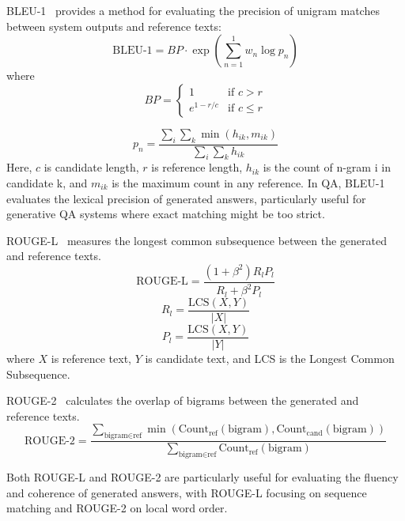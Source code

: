 \documentclass{article}
\begin{document}
BLEU-1~\cite{papineni2002bleu} provides a method for evaluating the precision of unigram matches between system outputs and reference texts:
\begin{equation}
    \text{BLEU-1} = BP \cdot \exp(\sum_{n=1}^{1} w_n \log p_n)
\end{equation}
where 
\begin{equation}
    BP = \begin{cases}
        1 & \text{if } c > r \\
        e^{1-r/c} & \text{if } c \leq r
        \end{cases}
\end{equation}

\begin{equation}
    p_n = \frac{\sum_{i}\sum_{k}\min(h_{ik}, m_{ik})}{\sum_{i}\sum_{k}h_{ik}}
\end{equation}
Here, \( c \) is candidate length, \( r \) is reference length, \( h_{ik} \) is the count of n-gram i in candidate k, and \( m_{ik} \) is the maximum count in any reference. In QA, BLEU-1 evaluates the lexical precision of generated answers, particularly useful for generative QA systems where exact matching might be too strict.


ROUGE-L~\cite{rouge} measures the longest common subsequence between the generated and reference texts.
\begin{equation}
    \text{ROUGE-L} = \frac{(1 + \beta^2)R_lP_l}{R_l + \beta^2P_l}
\end{equation}
\begin{equation}
    R_l = \frac{\text{LCS}(X,Y)}{|X|}
\end{equation}
\begin{equation}
    P_l = \frac{\text{LCS}(X,Y)}{|Y|}
\end{equation}
where \(X\) is reference text, \(Y \) is candidate text, and LCS is the Longest Common Subsequence.

ROUGE-2~\cite{rouge} calculates the overlap of bigrams between the generated and reference texts.
\begin{equation}
    \text{ROUGE-2} = \frac{\sum_{\text{bigram} \in \text{ref}}\min(\text{Count}_{\text{ref}}(\text{bigram}), \text{Count}_{\text{cand}}(\text{bigram}))}{\sum_{\text{bigram} \in \text{ref}}\text{Count}_{\text{ref}}(\text{bigram})}
\end{equation}

Both ROUGE-L and ROUGE-2 are particularly useful for evaluating the fluency and coherence of generated answers, with ROUGE-L focusing on sequence matching and ROUGE-2 on local word order.
\end{document}
